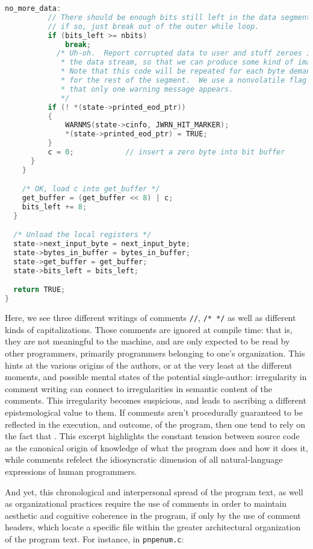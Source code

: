 \begin{lstlisting}[language=C, basicstyle=\tiny]
  no_more_data:
		  // There should be enough bits still left in the data segment; 
		  // if so, just break out of the outer while loop. 
		  if (bits_left >= nbits)
			  break;
			/* Uh-oh.  Report corrupted data to user and stuff zeroes into
			 * the data stream, so that we can produce some kind of image.
			 * Note that this code will be repeated for each byte demanded
			 * for the rest of the segment.  We use a nonvolatile flag to ensure
			 * that only one warning message appears.
			 */
		  if (! *(state->printed_eod_ptr)) 
		  {
			  WARNMS(state->cinfo, JWRN_HIT_MARKER);
			  *(state->printed_eod_ptr) = TRUE;
		  }
		  c = 0;			// insert a zero byte into bit buffer 
      }
    }

    /* OK, load c into get_buffer */
    get_buffer = (get_buffer << 8) | c;
    bits_left += 8;
  }

  /* Unload the local registers */
  state->next_input_byte = next_input_byte;
  state->bytes_in_buffer = bytes_in_buffer;
  state->get_buffer = get_buffer;
  state->bits_left = bits_left;

  return TRUE;
}
\end{lstlisting}

Here, we see three different writings of comments \lstinline{//}, \lstinline{/* */} as well as  different kinds of capitalizations. Those comments are ignored at compile time: that is, they are not meaningful to the machine, and are only expected to be read by other programmers, primarily programmers belonging to one's organization. This hints at the various origins of the authors, or at the very least at the different moments, and possible mental states of the potential single-author: irregularity in comment writing can connect to irregularities in semantic content of the comments. This irregularity becomes suspicious, and leads to ascribing a different epistemological value to them. If comments aren't procedurally guaranteed to be reflected in the execution, and outcome, of the program, then one tend to rely on the fact that . This excerpt highlights the constant tension between source code as the canonical origin of knowledge of what the program does and how it does it, while comments refelect the idiosyncratic dimension of all natural-language expressions of human programmers.

And yet, this chronological and interpersonal spread of the program text, as well as organizational practices require the use of comments in order to maintain aesthetic and cognitive coherence in the program, if only by the use of comment headers, which locate a specific file within the greater architectural organization of the program text. For instance,  in \lstinline{pnpenum.c}:

